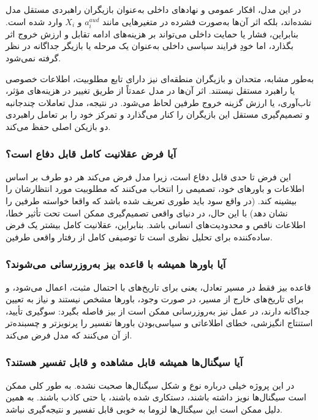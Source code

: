 \documentclass[12pt]{article}
\begin{document}
در این مدل، افکار عمومی و نهادهای داخلی به‌عنوان بازیگران
 راهبردی مستقل مدل نشده‌اند، بلکه اثر آن‌ها به‌صورت فشرده در متغیرهایی مانند 
 $a_i^{aud}$ و $X_i$
  وارد شده است. بنابراین، فشار یا حمایت
   داخلی می‌تواند بر هزینه‌های ادامه تقابل و ارزش خروج اثر بگذارد، اما خودِ 
  فرایند سیاسی داخلی به‌عنوان یک مرحله یا بازیگر جداگانه در نظر گرفته نمی‌شود.

به‌طور مشابه، متحدان و بازیگران منطقه‌ای نیز
 دارای تابع مطلوبیت، اطلاعات خصوصی یا راهبرد مستقل نیستند. اثر آن‌ها در مدل
 عمدتاً از طریق تغییر در هزینه‌های مؤثر، تاب‌آوری، یا ارزش گزینه خروج طرفین
 لحاظ می‌شود. در نتیجه، مدل تعاملات چندجانبه و تصمیم‌گیری مستقل این بازیگران
 را کنار می‌گذارد و تمرکز خود را بر تعامل راهبردی دو بازیکن اصلی حفظ می‌کند.


\subsubsection*{آیا فرض عقلانیت کامل قابل دفاع است؟}

این فرض تا حدی قابل دفاع است، زیرا مدل
 فرض می‌کند هر دو طرف بر اساس اطلاعات و باورهای خود، تصمیمی
 را انتخاب می‌کنند که مطلوبیت مورد انتظارشان را بیشینه کند.
 (در واقع سود باید طوری تعریف شده باشد که واقعا خواسته طرفین را نشان دهد)
 با این حال، در دنیای واقعی تصمیم‌گیری ممکن است تحت تأثیر خطا،
 اطلاعات ناقص و محدودیت‌های انسانی باشد.
 بنابراین، عقلانیت کامل بیشتر یک
 فرض ساده‌کننده برای تحلیل نظری
 است تا توصیفی کامل از رفتار واقعی طرفین.


\subsubsection*{آیا باورها همیشه با قاعده بیز به‌روزرسانی می‌شوند؟}

 قاعده بیز فقط
 در مسیر تعادل، یعنی برای تاریخ‌های با احتمال مثبت، اعمال می‌شود، و
برای تاریخ‌های خارج از مسیر، در صورت وجود،
 باورها مشخص نیستند و نیاز به تعیین جداگانه دارند،
در عمل نیز به‌روزرسانی ممکن است از بیز فاصله بگیرد:
سوگیری تأیید، استنتاج انگیزشی، خطای اطلاعاتی و سیاسی‌بودن باورها
تفسیر را پرنویزتر و چسبنده‌تر از آن می‌کنند که مدل فرض می‌کند.

\subsubsection*{آیا سیگنال‌ها همیشه قابل مشاهده و قابل تفسیر هستند؟}

در این پروژه خیلی درباره نوع و شکل سیگنال‌ها صحبت نشده. به طور کلی
ممکن است سیگنال‌ها نویز داشته باشند، دستکاری شده باشند، یا حتی
کاذب باشند. به همین دلیل ممکن است این سیگنال‌ها لزوما به خوبی
قابل تفسیر و نتیجه‌گیری نباشد. 
\end{document}
